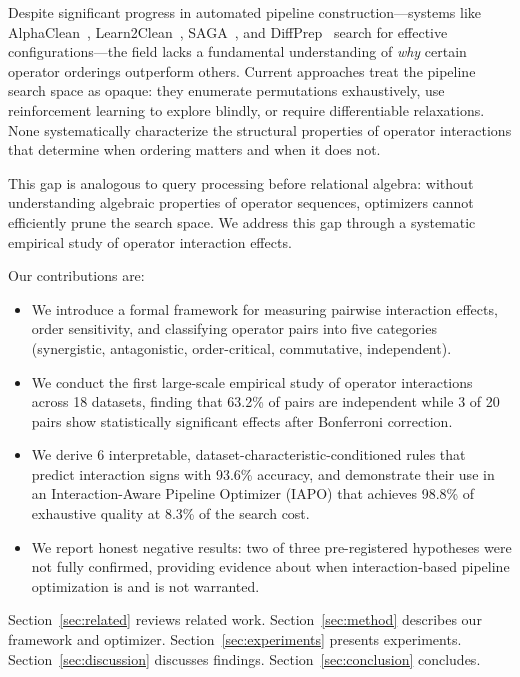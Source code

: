 \documentclass[preprint]{article}
\begin{document}
Despite significant progress in automated pipeline construction---systems like AlphaClean~\citep{Krishnan2019AlphaClean}, Learn2Clean~\citep{BertiEquille2019Learn2Clean}, SAGA~\citep{Siddiqi2024SAGA}, and DiffPrep~\citep{Li2023DiffPrep} search for effective configurations---the field lacks a fundamental understanding of \emph{why} certain operator orderings outperform others. Current approaches treat the pipeline search space as opaque: they enumerate permutations exhaustively, use reinforcement learning to explore blindly, or require differentiable relaxations. None systematically characterize the structural properties of operator interactions that determine when ordering matters and when it does not.

This gap is analogous to query processing before relational algebra: without understanding algebraic properties of operator sequences, optimizers cannot efficiently prune the search space. We address this gap through a systematic empirical study of operator interaction effects.

Our contributions are:
\begin{itemize}[nosep]
  \item We introduce a formal framework for measuring pairwise interaction effects, order sensitivity, and classifying operator pairs into five categories (synergistic, antagonistic, order-critical, commutative, independent).
  \item We conduct the first large-scale empirical study of operator interactions across 18 datasets, finding that 63.2\% of pairs are independent while 3 of 20 pairs show statistically significant effects after Bonferroni correction.
  \item We derive 6 interpretable, dataset-characteristic-conditioned rules that predict interaction signs with 93.6\% accuracy, and demonstrate their use in an Interaction-Aware Pipeline Optimizer (IAPO) that achieves 98.8\% of exhaustive quality at 8.3\% of the search cost.
  \item We report honest negative results: two of three pre-registered hypotheses were not fully confirmed, providing evidence about when interaction-based pipeline optimization is and is not warranted.
\end{itemize}

Section~\ref{sec:related} reviews related work. Section~\ref{sec:method} describes our framework and optimizer. Section~\ref{sec:experiments} presents experiments. Section~\ref{sec:discussion} discusses findings. Section~\ref{sec:conclusion} concludes.
\end{document}
